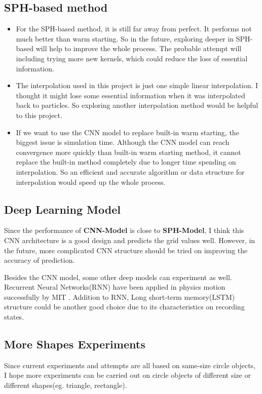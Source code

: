 \subsection{SPH-based method}
\begin{itemize}
    \item For the SPH-based method, it is still far away from perfect. It performs not much better than warm starting. So in the future, exploring deeper in SPH-based will help to improve the whole process. The probable attempt will including trying more new kernels, which could reduce the loss of essential information.
    \item The interpolation used in this project is just one simple linear interpolation. I thought it might lose some essential information when it was interpolated back to particles. So exploring another interpolation method would be helpful to this project.
    \item If we want to use the CNN model to replace built-in warm starting, the biggest issue is simulation time. Although the CNN model can reach convergence more quickly than built-in warm starting method, it cannot replace the built-in method completely due to longer time spending on interpolation. So an efficient and accurate algorithm or data structure for interpolation would speed up the whole process.
\end{itemize}

\subsection{Deep Learning Model}
Since the performance of \textbf{CNN-Model} is close to \textbf{SPH-Model}, I think this CNN architecture is a good design and predicts the grid values well. However, in the future, more complicated CNN structure should be tried on improving the accuracy of prediction.

Besides the CNN model, some other deep models can experiment as well. Recurrent Neural Networks(RNN) have been applied in physics motion successfully by MIT \cite{DBLP:journals/corr/ChangUTT16}. Addition to RNN, Long short-term memory(LSTM) structure could be another good choice due to its characteristics on recording states. 


\subsection{More Shapes Experiments}
Since current experiments and attempts are all based on same-size circle objects, I hope more experiments can be carried out on circle objects of different size or different shapes(eg. triangle, rectangle).